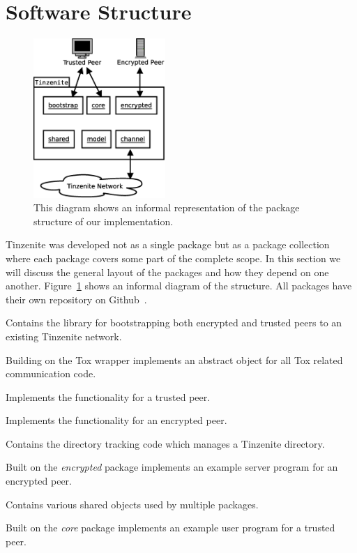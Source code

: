 \section{Software Structure}
\label{sec:Software Structure}

\begin{figure}[htp]
\centering
    \includegraphics[width=5cm]{diagram/topo_implementation}
\caption[Tinzenite Structure]{This diagram shows an informal representation of the package structure of our implementation.}
\label{fig:implementation_structure}
\end{figure}

Tinzenite was developed not as a single package but as a package collection where each package covers some part of the complete scope.
In this section we will discuss the general layout of the packages and how they depend on one another.
Figure~\ref{fig:implementation_structure} shows an informal diagram of the structure.
All packages have their own repository on Github~\cite{web:site:github:tinzenite}.

\begin{description}[leftmargin=6em,style=nextline,noitemsep,nolistsep]
    \item[bootstrap]
        Contains the library for bootstrapping both encrypted and trusted peers to an existing Tinzenite network.
    \item[channel]
        Building on the Tox wrapper implements an abstract object for all Tox related communication code.
    \item[core]
        Implements the functionality for a trusted peer.
    \item[encrypted]
        Implements the functionality for an encrypted peer.
    \item[model]
        Contains the directory tracking code which manages a Tinzenite directory.
    \item[server]
        Built on the \emph{encrypted} package implements an example server program for an encrypted peer.
    \item[shared]
        Contains various shared objects used by multiple packages.
    \item[tin]
        Built on the \emph{core} package implements an example user program for a trusted peer.
\end{description}

